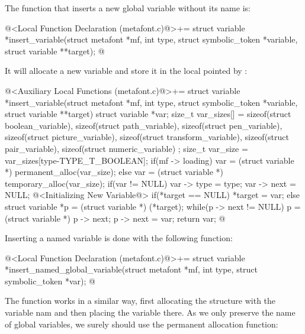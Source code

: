 The function that inserts a new global variable without its name is:

\iniciocodigo
@<Local Function Declaration (metafont.c)@>+=
struct variable *insert_variable(struct metafont *mf,
                                 int type,
                                 struct symbolic_token *variable,
                                 struct variable **target);
@
\fimcodigo

It will allocate a new variable and store it in the local pointed
by :

\iniciocodigo
@<Auxiliary Local Functions (metafont.c)@>+=
struct variable *insert_variable(struct metafont *mf,
                                 int type,
                                 struct symbolic_token *variable,
                                 struct variable **target){
  struct variable *var;
  size_t var_sizes[] = {
    sizeof(struct boolean_variable), sizeof(struct path_variable),
    sizeof(struct pen_variable), sizeof(struct picture_variable),
    sizeof(struct transform_variable), sizeof(struct pair_variable),
    sizeof(struct numeric_variable)
  };
  size_t var_size = var_sizes[type-TYPE_T_BOOLEAN];
  if(mf -> loading)
    var = (struct variable *) permanent_alloc(var_size);
  else
    var = (struct variable *) temporary_alloc(var_size);
  if(var != NULL){
    var -> type = type;
    var -> next = NULL;
    @<Initializing New Variable@>
  }
  if(*target == NULL)
    *target = var;
  else{
    struct variable *p = (struct variable *) (*target);
    while(p -> next != NULL)
      p = (struct variable *) p -> next;
    p -> next = var;
  }
  return var;
}
@
\fimcodigo

Inserting a named variable is done with the following function:

\iniciocodigo
@<Local Function Declaration (metafont.c)@>+=
struct variable *insert_named_global_variable(struct metafont *mf,
                                             int type,
                                             struct symbolic_token *var);
@
\fimcodigo

The function works in a similar way, first allocating the structure
with the variable nam and then placing the variable there. As we only
preserve the name of global variables, we surely should use the
permanent allocation function:

